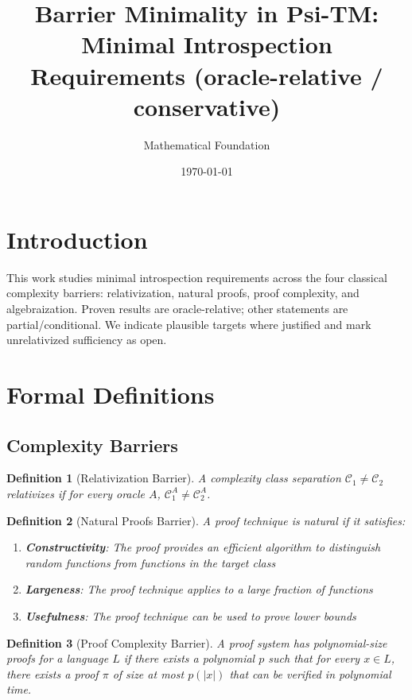 \documentclass[11pt]{article}
\title{Barrier Minimality in Psi-TM:\\
Minimal Introspection Requirements (oracle-relative / conservative)}
\author{Mathematical Foundation}
\date{\today}
\newtheorem{definition}{Definition}
\begin{document}
\maketitle

\section{Introduction}

This work studies minimal introspection requirements across the four classical complexity barriers: relativization, natural proofs, proof complexity, and algebraization. Proven results are oracle-relative; other statements are partial/conditional. We indicate plausible targets where justified and mark unrelativized sufficiency as open.

\section{Formal Definitions}

\subsection{Complexity Barriers}

\begin{definition}[Relativization Barrier]
A complexity class separation $\mathcal{C}_1 \neq \mathcal{C}_2$ relativizes if for every oracle $A$, $\mathcal{C}_1^A \neq \mathcal{C}_2^A$.
\end{definition}

\begin{definition}[Natural Proofs Barrier]
A proof technique is natural if it satisfies:
\begin{enumerate}
\item \textbf{Constructivity}: The proof provides an efficient algorithm to distinguish random functions from functions in the target class
\item \textbf{Largeness}: The proof technique applies to a large fraction of functions
\item \textbf{Usefulness}: The proof technique can be used to prove lower bounds
\end{enumerate}
\end{definition}

\begin{definition}[Proof Complexity Barrier]
A proof system has polynomial-size proofs for a language $L$ if there exists a polynomial $p$ such that for every $x \in L$, there exists a proof $\pi$ of size at most $p(|x|)$ that can be verified in polynomial time.
\end{definition}
\end{document}
